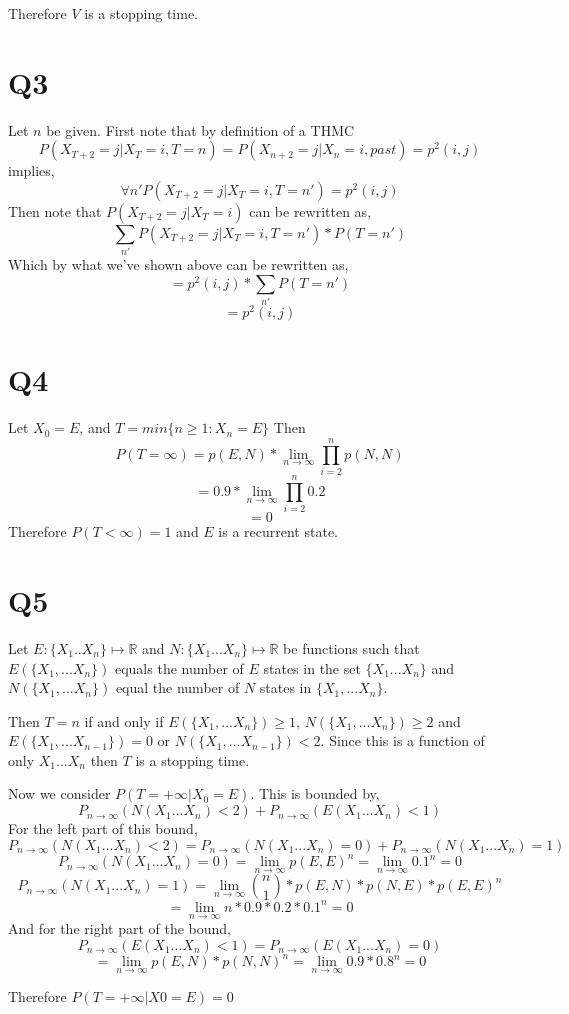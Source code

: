 \documentclass{article}
\begin{document}
Therefore $V$ is a stopping time.

\section*{Q3}
Let $n$ be given. First note that by definition of a THMC
\[
P(X_{T+2} = j | X_T = i , T = n) = P(X_{n+2} = j | X_n = i, past) = p^2(i,j)
\]
implies,
\[
\forall n'
P(X_{T+2} = j | X_T = i , T = n') = p^2(i,j)
\]
Then note that $P(X_{T+2} = j | X_T = i)$ can be rewritten as,
\[
\sum_{n'} P(X_{T+2} = j | X_T = i, T=n')*P(T=n')
\]
Which by what we've shown above can be rewritten as,
\[
= p^2(i,j) * \sum_{n'} P(T=n')
\] 
\[
=p^2(i,j)
\]

\section*{Q4}
Let $X_0 = E$, and $T = min\{n \geq 1 : X_n = E\}$
Then 
\[
P(T = \infty) = p(E,N) * \lim_{n \to \infty} \prod_{i = 2}^{n} p(N,N)
\]
\[
= 0.9 * \lim_{n \to \infty} \prod_{i = 2}^{n} 0.2
\]
\[
= 0
\]
Therefore $P(T < \infty) = 1$ and $E$ is a recurrent state.

\section*{Q5}
Let $E : \{X_1 .. X_n\} \mapsto \mathbb{R}$ and $N : \{X_1 ... X_n\} \mapsto \mathbb{R}$ be functions such that $E(\{X_1, ... X_n\})$ equals the number of $E$ states in the set $\{X_1 ... X_n\}$ and $N(\{X_1, ... X_n\})$ equal the number of $N$ states in $\{X_1, ... X_n\}$. 

Then $T = n$ if and only if $E(\{X_1,... X_n\}) \geq 1$, $N(\{X_1,... X_n\}) \geq 2$ and $E(\{X_1,... X_{n-1}\}) = 0$ or $N(\{X_1,... X_{n-1}\}) < 2$. Since this is a function of only $X_1 ... X_n$ then $T$ is a stopping time. 

Now we consider $P(T = +\infty | X_0 = E)$.
This is bounded by,
\[
P_{n \to \infty}(N(X_1 ... X_n) < 2) + P_{n \to \infty}(E(X_1 ... X_n) < 1)
\]
For the left part of this bound,
\[
P_{n \to \infty}(N(X_1 ... X_n) < 2) = P_{n \to \infty}(N(X_1 ... X_n) = 0) + 
P_{n \to \infty}(N(X_1 ... X_n) = 1)
\]
\[
P_{n \to \infty}(N(X_1 ... X_n) = 0) = \lim_{n \to \infty} p(E,E)^n =\lim_{n \to \infty} 0.1^n = 0
\]
\[
P_{n \to \infty}(N(X_1 ... X_n) = 1) = \lim_{n \to \infty} {{n}\choose{1}} * p(E,N) * p(N,E) * p(E,E)^n
\]
\[
= \lim_{n \to \infty} n * 0.9 * 0.2 * 0.1 ^n = 0
\]
And for the right part of the bound,
\[ 
P_{n \to \infty}(E(X_1 ... X_n) < 1) = P_{n \to \infty}(E(X_1 ... X_n) = 0)
\]
\[
= \lim_{n \to \infty} p(E,N) * p(N,N)^n = \lim_{n \to \infty} 0.9 * 0.8 ^ n = 0
\]

Therefore $P( T = +\infty | X0 = E) = 0$
\end{document}
